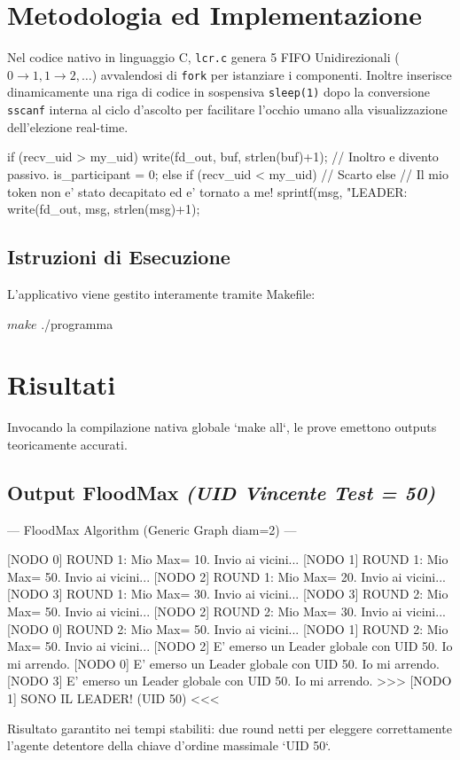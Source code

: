 \documentclass[a4paper,12pt]{article}
\begin{document}
\section{Metodologia ed Implementazione}

Nel codice nativo in linguaggio C, \texttt{lcr.c} genera 5 FIFO Unidirezionali ($0 \rightarrow 1, 1 \rightarrow 2, \dots$) avvalendosi di \texttt{fork} per istanziare i componenti. Inoltre inserisce dinamicamente una riga di codice in sospensiva \texttt{sleep(1)} dopo la conversione \texttt{sscanf} interna al ciclo d'ascolto per facilitare l'occhio umano alla visualizzazione dell'elezione real-time.

\begin{ccode}
if (recv_uid > my_uid) {
    write(fd_out, buf, strlen(buf)+1); // Inoltro e divento passivo.
    is_participant = 0;
} else if (recv_uid < my_uid) {
    // Scarto
} else {
    // Il mio token non e' stato decapitato ed e' tornato a me!
    sprintf(msg, "LEADER:%
    write(fd_out, msg, strlen(msg)+1);
}
\end{ccode}


\subsection{Istruzioni di Esecuzione}
L'applicativo viene gestito interamente tramite Makefile:
\begin{terminal}
$ make
$ ./programma
\end{terminal}

\section{Risultati}
Invocando la compilazione nativa globale `make all`, le prove emettono outputs teoricamente accurati.

\subsection{Output FloodMax \textit{(UID Vincente Test = 50)}}
\begin{terminal}
--- FloodMax Algorithm (Generic Graph diam=2) ---

[NODO 0] ROUND 1: Mio Max= 10. Invio ai vicini...
[NODO 1] ROUND 1: Mio Max= 50. Invio ai vicini...
[NODO 2] ROUND 1: Mio Max= 20. Invio ai vicini...
[NODO 3] ROUND 1: Mio Max= 30. Invio ai vicini...
[NODO 3] ROUND 2: Mio Max= 50. Invio ai vicini...
[NODO 2] ROUND 2: Mio Max= 30. Invio ai vicini...
[NODO 0] ROUND 2: Mio Max= 50. Invio ai vicini...
[NODO 1] ROUND 2: Mio Max= 50. Invio ai vicini...
[NODO 2] E' emerso un Leader globale con UID 50. Io mi arrendo.
[NODO 0] E' emerso un Leader globale con UID 50. Io mi arrendo.
[NODO 3] E' emerso un Leader globale con UID 50. Io mi arrendo.
>>> [NODO 1] SONO IL LEADER! (UID 50) <<<
\end{terminal}
Risultato garantito nei tempi stabiliti: due round netti per eleggere correttamente l'agente detentore della chiave d'ordine massimale `UID 50`.
\end{document}
